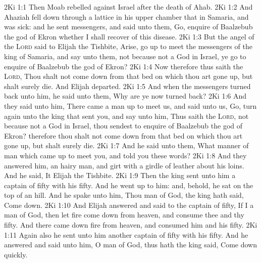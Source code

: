 \vs 2Ki 1:1 Then Moab rebelled against Israel after the death of Ahab.
\vs 2Ki 1:2 And Ahaziah fell down through a lattice in his upper chamber that  in Samaria, and was sick: and he sent messengers, and said unto them, Go, enquire of Baalzebub the god of Ekron whether I shall recover of this disease.
\vs 2Ki 1:3 But the angel of the \textsc{Lord} said to Elijah the Tishbite, Arise, go up to meet the messengers of the king of Samaria, and say unto them,  not because  not a God in Israel,  ye go to enquire of Baalzebub the god of Ekron?
\vs 2Ki 1:4 Now therefore thus saith the \textsc{Lord}, Thou shalt not come down from that bed on which thou art gone up, but shalt surely die. And Elijah departed.
\vs 2Ki 1:5 And when the messengers turned back unto him, he said unto them, Why are ye now turned back?
\vs 2Ki 1:6 And they said unto him, There came a man up to meet us, and said unto us, Go, turn again unto the king that sent you, and say unto him, Thus saith the \textsc{Lord},  not because  not a God in Israel,  thou sendest to enquire of Baalzebub the god of Ekron? therefore thou shalt not come down from that bed on which thou art gone up, but shalt surely die.
\vs 2Ki 1:7 And he said unto them, What manner of man  which came up to meet you, and told you these words?
\vs 2Ki 1:8 And they answered him,  an hairy man, and girt with a girdle of leather about his loins. And he said, It  Elijah the Tishbite.
\vs 2Ki 1:9 Then the king sent unto him a captain of fifty with his fifty. And he went up to him: and, behold, he sat on the top of an hill. And he spake unto him, Thou man of God, the king hath said, Come down.
\vs 2Ki 1:10 And Elijah answered and said to the captain of fifty, If I  a man of God, then let fire come down from heaven, and consume thee and thy fifty. And there came down fire from heaven, and consumed him and his fifty.
\vs 2Ki 1:11 Again also he sent unto him another captain of fifty with his fifty. And he answered and said unto him, O man of God, thus hath the king said, Come down quickly.
